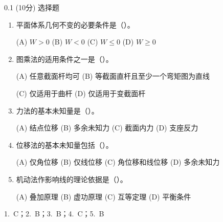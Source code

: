 \begin{question}{0.1}
(10分) 选择题
\begin{enumerate}
\item 平面体系几何不变的必要条件是（\quad）。

  (A) $W>0$ \quad (B) $W<0$ \quad (C) $W\leq 0$ \quad (D) $W\geq 0$

\item 图乘法的适用条件之一是（\quad）。

  (A) 任意截面杆均可 \quad (B) 等截面直杆且至少一个弯矩图为直线

  (C) 仅适用于曲杆 \quad (D) 仅适用于变截面杆

\item 力法的基本未知量是（\quad）。

  (A) 结点位移 \quad (B) 多余未知力 \quad (C) 截面内力 \quad (D) 支座反力

\item 位移法的基本未知量包括（\quad）。

  (A) 仅角位移 \quad (B) 仅线位移
  (C) 角位移和线位移 \quad (D) 多余未知力

\item 机动法作影响线的理论依据是（\quad）。

  (A) 叠加原理 \quad (B) 虚功原理 \quad (C) 互等定理 \quad (D) 平衡条件
\end{enumerate}
\end{question}

\begin{solution}
1.~C；2.~B；3.~B；4.~C；5.~B
\end{solution}
